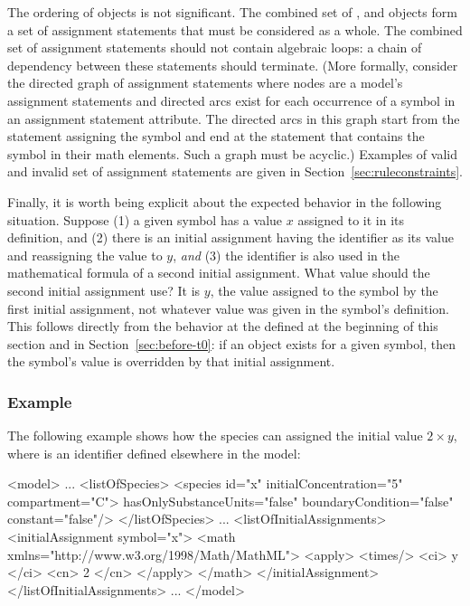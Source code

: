 The ordering of \InitialAssignment objects is not significant.
The combined set of \InitialAssignment, \AssignmentRule and
\KineticLaw objects form a set of assignment statements that must
be considered as a whole.  The combined set of assignment
statements should not contain algebraic loops: a chain of
dependency between these statements should terminate.  (More
formally, consider the directed graph of assignment statements
where nodes are a model's assignment statements and directed arcs
exist for each occurrence of a symbol in an assignment statement
 attribute.  The directed arcs in this graph start from
the statement assigning the symbol and end at the statement that
contains the symbol in their math elements.  Such a graph must be
acyclic.) Examples of valid and invalid set of assignment
statements are given in Section~\ref{sec:ruleconstraints}.

Finally, it is worth being explicit about the expected behavior in
the following situation.  Suppose (1) a given symbol has a value
$x$ assigned to it in its definition, and (2) there is an initial
assignment having the identifier as its  value and
reassigning the value to $y$, \emph{and} (3) the identifier is
also used in the mathematical formula of a second initial
assignment.  What value should the second initial assignment use?
It is $y$, the value assigned to the symbol by the first initial
assignment, not whatever value was given in the symbol's
definition.  This follows directly from the behavior at the
defined at the beginning of this section and in
Section~\ref{sec:before-t0}: if an \InitialAssignment object
exists for a given symbol, then the symbol's value is overridden
by that initial assignment.


\subsubsection{Example}

The following example shows how the species  can assigned
the initial value $2 \times y$, where  is an identifier
defined elsewhere in the model:

\begin{example}

<model>
    ...
    <listOfSpecies>
        <species id="x" initialConcentration="5" compartment="C">
                 hasOnlySubstanceUnits="false" boundaryCondition="false" 
                 constant="false"/>
    </listOfSpecies>
    ...
    <listOfInitialAssignments>
        <initialAssignment symbol="x">
            <math xmlns="http://www.w3.org/1998/Math/MathML">
                <apply>
                    <times/> 
                    <ci> y </ci> 
                    <cn> 2 </cn>
                </apply>
            </math>
        </initialAssignment>
    </listOfInitialAssignments>
    ...
</model>
\end{example}

